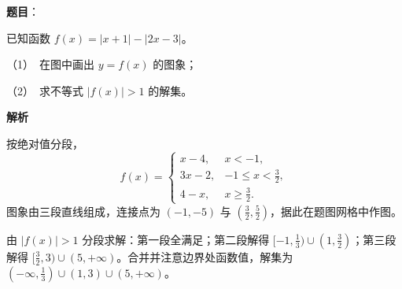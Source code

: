 \begin{answer}

\textbf{题目}：

已知函数 \(f(x)=|x+1|-|2x-3|\)。

   （1）　在图中画出 \(y=f(x)\) 的图象；

   （2）　求不等式 \(|f(x)|>1\) 的解集。
\nopagebreak[4]
\begin{center}\end{center}
\nopagebreak[4]
\textbf{解析}


按绝对值分段，
\nopagebreak[4]
\[
f(x)=\begin{cases}
x-4,&x<-1,\\
3x-2,&-1\le x<\frac32,\\
4-x,&x\ge\frac32.
\end{cases}
\]
图象由三段直线组成，连接点为 \((-1,-5)\) 与 \((\frac32,\frac52)\)，据此在题图网格中作图。


由 \(|f(x)|>1\) 分段求解：第一段全满足；第二段解得 \([-1,\frac13)\cup(1,\frac32)\)；第三段解得 \([\frac32,3)\cup(5,+\infty)\)。合并并注意边界处函数值，解集为 \((-\infty,\frac13)\cup(1,3)\cup(5,+\infty)\)。



\end{answer}